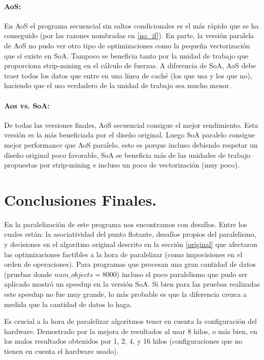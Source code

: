 \documentclass{article}
\begin{document}
\paragraph{AoS:}
En AoS el programa secuencial sin saltos condicionales es el más rápido que se ha conseguido (por las razones
nombradas en \ref{no_if}). En parte, la versión paralela de AoS no pudo ver otro tipo de optimizaciones como
la pequeña vectorización que sí existe en SoA. Tampoco se beneficia tanto por la unidad de trabajo que
proporciona strip-mining en el cálculo de fuerzas. A diferencia de SoA, AoS debe traer todos los
datos que entre en una línea de caché (los que usa y los que no), haciendo que el uso verdadero de la unidad
de trabajo sea mucho menor.

\paragraph{Aos vs. SoA:}
De todas las versiones finales, AoS secuencial consigue el mejor rendimiento. Esta versión es la más beneficiada
por el diseño original. Luego SoA paralelo consigue mejor performance que AoS paralelo, esto es porque
incluso debiendo respetar un diseño original poco favorable, SoA se beneficia más de las unidades de trabajo
propuestas por strip-mining e incluso un poco de vectorización (muy poco).

\section{Conclusiones Finales.\label{conclusiones}}

En la paralelización de este programa nos encontramos con desafíos. Entre los cuales están: la asociatividad
del punto flotante, desafíos propios del paralelismo, y decisiones en el algoritmo original descrito en
la sección \ref{original} que afectaron las optimizaciones factibles a la hora de paralelizar (como impocisiones
en el orden de operaciones). Para programas que procesan una gran cantidad de datos (pruebas donde ${num\_objects=8000}$)
incluso el poco paralelismo que pudo ser aplicado mostró un speedup en la versión SoA. Si bien para las pruebas realizadas este speedup no fue
muy grande, lo más probable es que la diferencia crezca a medida que la cantidad de datos lo haga.

Es crucial a la hora de paralelizar algoritmos tener en cuenta la configuración del hardware. Demostrado por
la mejora de resultados al usar 8 hilos, o más bien, en los malos resultados obtenidos por
1, 2, 4, y 16 hilos (configuraciones que no tienen en cuenta el hardware usado).
\end{document}

